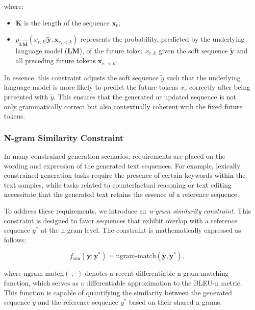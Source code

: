 \documentclass{article}
\begin{document}
where:
\begin{itemize}
    \item \(\mathbf{K}\) is the length of the sequence \(\mathbf{x_r}\),
    \item \(p_{\mathbf{\overrightarrow{LM}}}(x_{r,k}|\mathbf{\tilde{y}}, \mathbf{x}_{r,<k})\) represents the probability, predicted by the underlying language model (\(\mathbf{LM}\)), of the future token \(x_{r,k}\) given the soft sequence \(\mathbf{\tilde{y}}\) and all preceding future tokens \(\mathbf{x}_{r,<k}\).
\end{itemize}



In essence, this constraint adjusts the soft sequence \(\tilde{y}\) such that the underlying language model is more likely to predict the future tokens \(x_r\) correctly after being presented with \(\tilde{y}\). This ensures that the generated or updated sequence is not only grammatically correct but also contextually coherent with the fixed future tokens.

\subsubsection{N-gram Similarity Constraint}

In many constrained generation scenarios, requirements are placed on the wording and expression of the generated text sequences. For example, lexically constrained generation tasks require the presence of certain keywords within the text samples, while tasks related to counterfactual reasoning or text editing necessitate that the generated text retains the essence of a reference sequence.

To address these requirements, we introduce an \emph{n-gram similarity constraint}. This constraint is designed to favor sequences that exhibit overlap with a reference sequence \(y^*\) at the n-gram level. The constraint is mathematically expressed as follows:

\begin{equation}
    f_{\text{sim}}(\tilde{\mathbf{y}}; \mathbf{y}^*) = \text{ngram-match}(\tilde{\mathbf{y}}, \mathbf{y}^*),
\end{equation}

where \(\text{ngram-match}(\cdot, \cdot)\) denotes a recent differentiable n-gram matching function, which serves as a differentiable approximation to the BLEU-n metric. This function is capable of quantifying the similarity between the generated sequence \(\tilde{y}\) and the reference sequence \(y^*\) based on their shared n-grams.
\end{document}

